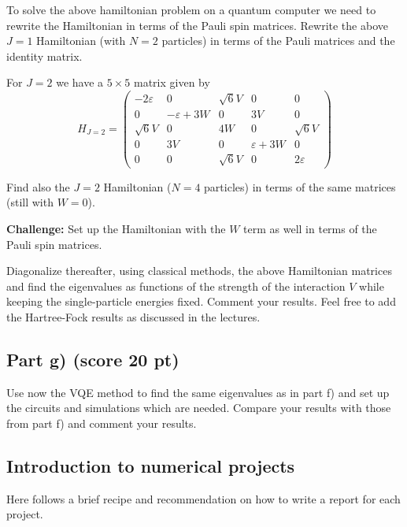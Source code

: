 \documentclass[%
oneside,                 %
final,                   %
10pt]{article}
\begin{document}
To solve the above hamiltonian problem on a quantum computer we need
to rewrite the Hamiltonian in terms of the Pauli spin
matrices. Rewrite the above $J=1$ Hamiltonian (with $N=2$ particles)
in terms of the Pauli matrices and the identity matrix.

For $J=2$ we have a $5\times 5$ matrix given by
\begin{equation}
H_{J = 2} =
\begin{pmatrix}
-2\varepsilon & 0 & \sqrt{6}V & 0 & 0 \\
0 & -\varepsilon + 3W & 0 & 3V & 0 \\
\sqrt{6}V & 0 & 4W & 0 & \sqrt{6}V \\
0 & 3V & 0 & \varepsilon + 3W & 0 \\
0 & 0 & \sqrt{6}V & 0 & 2\varepsilon
\end{pmatrix}
\end{equation}

Find also the $J=2$ Hamiltonian ($N=4$ particles) in terms of the same matrices (still with $W=0$).

\textbf{Challenge:} Set up the Hamiltonian with the $W$ term as well in terms of the Pauli spin matrices.

Diagonalize thereafter, using classical methods, the above Hamiltonian matrices and find the
eigenvalues as functions of the strength of the interaction $V$ while
keeping the single-particle energies fixed. Comment your results. Feel
free to add the Hartree-Fock results as discussed in the lectures.

\subsection{Part g) (score 20 pt)}

Use now the VQE method to find the same eigenvalues as in part f) and
set up the circuits and simulations which are needed. Compare your
results with those from part f) and comment your results.

\subsection{Introduction to numerical projects}

Here follows a brief recipe and recommendation on how to write a report for each
project.
\end{document}
